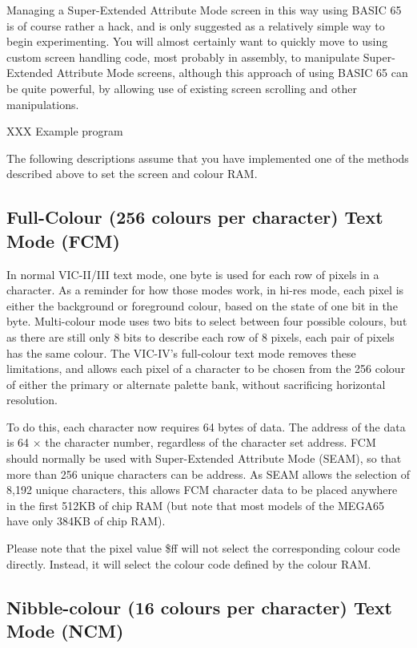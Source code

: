 Managing a Super-Extended Attribute Mode screen in this way using BASIC 65 is of course rather a hack, and is only suggested as a relatively simple way to begin experimenting.  You will almost certainly want to quickly move to using custom screen handling code, most probably in assembly, to manipulate Super-Extended Attribute Mode screens, although this approach of using BASIC 65 can be quite powerful, by allowing use of existing screen scrolling and other manipulations.

XXX Example program

The following descriptions assume that you have implemented one of the methods described above to set the screen and colour RAM.

\subsection{Full-Colour (256 colours per character) Text Mode (FCM)}

In normal VIC-II/III text mode, one byte is used for each row of pixels in a character.  As a reminder for how those modes work, in
hi-res mode, each pixel is either the background or foreground colour, based on the state of one bit in the byte.  Multi-colour mode
uses two bits to select between four possible colours, but as there are still only 8 bits to describe each row of 8 pixels, each pair
of pixels has the same colour. The VIC-IV's full-colour text mode removes these limitations, and allows each pixel of a character to
be chosen from the 256 colour of either the primary or alternate palette bank, without sacrificing horizontal resolution.

To do this, each character now requires 64 bytes of data. The address of the data is 64 $\times$ the character number, regardless
of the character set address.
FCM should
normally be used with Super-Extended Attribute Mode (SEAM), so that more than 256 unique characters can be address. As SEAM allows
the selection of 8,192 unique characters, this allows FCM character data to be placed anywhere in the first 512KB of chip RAM (but
note that most models of the MEGA65 have only 384KB of chip RAM).

Please note that the pixel value \$ff will not select the corresponding colour code directly. Instead, it will select the colour code defined by the colour RAM.

\subsection{Nibble-colour (16 colours per character) Text Mode (NCM)}


